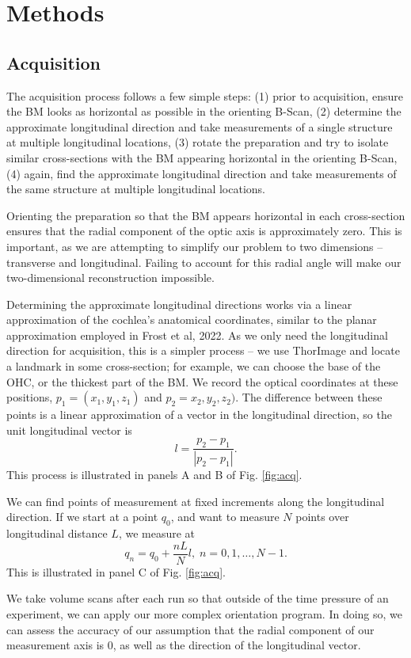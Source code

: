 \documentclass[aip,cp,amsmath,amssymb,reprint]{revtex4-2}
\begin{document}
\section{\label{sec:methods}Methods}

\subsection{\label{sec:acquisition}Acquisition}
\par{The acquisition process follows a few simple steps: (1) prior to acquisition, ensure the BM looks as horizontal as possible in the orienting B-Scan, (2) determine the approximate longitudinal direction and take measurements of a single structure at multiple longitudinal locations, (3) rotate the preparation and try to isolate similar cross-sections with the BM appearing horizontal in the orienting B-Scan, (4) again, find the approximate longitudinal direction and take measurements of the same structure at multiple longitudinal locations.}
\par{Orienting the preparation so that the BM appears horizontal in each cross-section ensures that the radial component of the optic axis is approximately zero. This is important, as we are attempting to simplify our problem to two dimensions – transverse and longitudinal. Failing to account for this radial angle will make our two-dimensional reconstruction impossible.}
\par{Determining the approximate longitudinal directions works via a linear approximation of the cochlea’s anatomical coordinates, similar to the planar approximation employed in Frost et al, 2022. As we only need the longitudinal direction for acquisition, this is a simpler process – we use ThorImage and locate a landmark in some cross-section; for example, we can choose the base of the OHC, or the thickest part of the BM. We record the optical coordinates at these positions, $p_1 = (x_1,y_1,z_1)$ and $p_2 = x_2, y_2, z_2)$. The difference between these points is a linear approximation of a vector in the longitudinal direction, so the unit longitudinal vector is
	\begin{equation}
		\label{eqn:lunit}
		l = \frac{p_2-p_1}{|p_2-p_1|}.
	\end{equation}
This process is illustrated in panels A and B of Fig. \ref{fig:acq}.}
\par{We can find points of measurement at fixed increments along the longitudinal direction. If we start at a point $q_0$, and want to measure $N$ points over longitudinal distance $L$, we measure at 
	\begin{equation}
		\label{eqn:points}
		q_n = q_0 + \frac{nL}{N}l,\;n=0,1,\ldots,N-1.
	\end{equation}
This is illustrated in panel C of Fig. \ref{fig:acq}.}
\par{We take volume scans after each run so that outside of the time pressure of an experiment, we can apply our more complex orientation program\cite{frost2022}. In doing so, we can assess the accuracy of our assumption that the radial component of our measurement axis is 0, as well as the direction of the longitudinal vector.}
\end{document}
